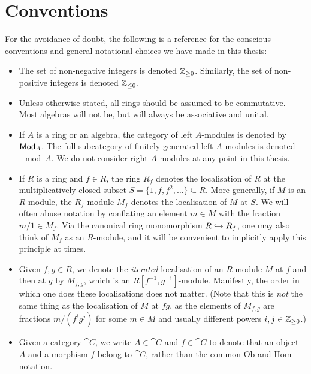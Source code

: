 \chapter{Conventions}
\label{conventions}

For the avoidance of doubt, the following is a reference for the
conscious conventions and general notational choices we have made in
this thesis:

\begin{itemize}
  \item
    The set of non-negative integers is denoted $\mathbb{Z}_{\geq 0}$.
    Similarly, the set of non-positive integers is denoted $\mathbb{Z}_{\leq 0}$.

  \item
    Unless otherwise stated, all rings should be assumed to be commutative.
    Most algebras will not be, but will always be associative and unital.

  \item
    If $A$ is a ring or an algebra, the category of left $A$-modules
    is denoted by ${\mathsf{Mod}}_{{A}}$.
    The full subcategory of finitely generated left $A$-modules is
    denoted $\mod{A}$.
    We do not consider right $A$-modules at any point in this thesis.

  \item
    If $R$ is a ring and $f \in R$, the ring $R_f$ denotes the
    localisation of $R$ at the multiplicatively closed subset $S =
    \{1, f, f^2, \ldots\} \subseteq R$.
    More generally, if $M$ is an $R$-module, the $R_f$-module $M_f$
    denotes the localisation of $M$ at $S$.
    We will often abuse notation by conflating an element $m \in M$
    with the fraction $m/1 \in M_f$.
    Via the canonical ring monomorphism $R \hookrightarrow R_f$, one may also
    think of $M_f$ as an $R$-module, and it will be convenient to
    implicitly apply this principle at times.

  \item
    Given $f, g \in R$, we denote the \emph{iterated} localisation of
    an $R$-module $M$ at $f$ and then at $g$ by $M_{f, g}$, which is
    an $R[f^{-1}, g^{-1}]$-module.
    Manifestly, the order in which one does these localisations does not matter.
    (Note that this is \emph{not} the same thing as the localisation
      of $M$ at $fg$, as the elements of $M_{f, g}$ are fractions
      $m/(f^i g^j)$ for some $m \in M$ and usually different powers $i,
    j \in \mathbb{Z}_{\geq 0}$.)

  \item
    Given a category $\cat{C}$, we write $A \in \cat{C}$ and $f \in
    \cat{C}$ to denote that an object $A$ and a morphism $f$ belong
    to $\cat{C}$, rather than the common Ob and Hom notation.


\end{itemize}
